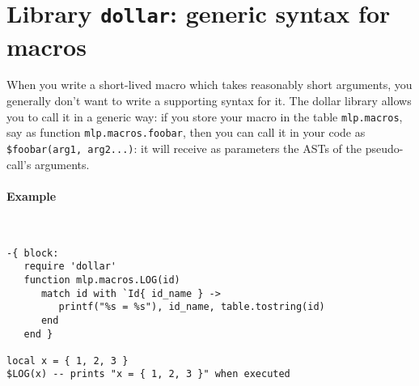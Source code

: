 \section{Library {\tt dollar}: generic syntax for macros}
When you write a short-lived macro which takes reasonably short arguments, you
generally don't want to write a supporting syntax for it. The dollar library
allows you to call it in a generic way: if you store your macro in the table
{\tt mlp.macros}, say as function {\tt mlp.macros.foobar}, then you can call it
in your code as {\tt\$foobar(arg1, arg2...)}: it will receive as parameters the
ASTs of the pseudo-call's arguments.

\paragraph{Example}~
\begin{verbatim}
-{ block:
   require 'dollar'
   function mlp.macros.LOG(id)
      match id with `Id{ id_name } -> 
         printf("%s = %s"), id_name, table.tostring(id)
      end
   end }

local x = { 1, 2, 3 }
$LOG(x) -- prints "x = { 1, 2, 3 }" when executed
\end{verbatim}
